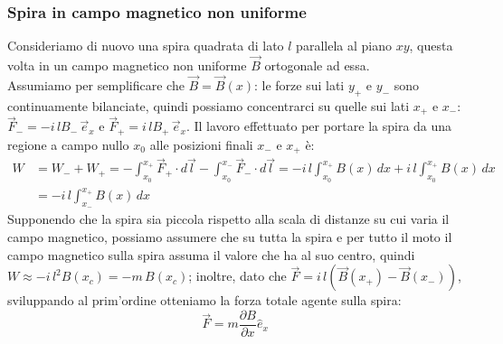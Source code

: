 \subsubsection{Spira in campo magnetico non uniforme}

Consideriamo di nuovo una spira quadrata di lato $ l $ parallela al piano $ xy $, questa volta in un campo magnetico non uniforme $ \vec{B} $ ortogonale ad essa. \\ 
%
Assumiamo per semplificare che $ \vec{B} = \vec{B}(x) $: le forze sui lati $ y_+ $ e $ y_- $ sono continuamente bilanciate, quindi possiamo concentrarci su quelle sui lati $ x_+ $ e $ x_- $: $ \vec{F}_- = -i\,lB_- \,\vec{e}_x $ e $ \vec{F}_+ = i\,lB_+ \,\vec{e}_x $. Il lavoro effettuato per portare la spira da una regione a campo nullo $ x_0 $ alle posizioni finali $ x_- $ e $ x_+ $ è:
\begin{equation}
	\begin{split}
		W &= W_- + W_+ = -\int_{x_0}^{x_+} \vec{F}_+ \cdot d\vec{l} - \int_{x_0}^{x_-} \vec{F}_- \cdot d\vec{l} = -i\,l\int_{x_0}^{x_+} B(x) \,dx + i\,l\int_{x_0}^{x_+} B(x) \,dx \\ 
		  &= -i\,l\int_{x_-}^{x_+} B(x) \,dx
	\end{split}
	\label{eq:}
\end{equation}
Supponendo che la spira sia piccola rispetto alla scala di distanze su cui varia il campo magnetico, possiamo assumere che su tutta la spira e per tutto il moto il campo magnetico sulla spira assuma il valore che ha al suo centro, quindi $ W \approx -i\,l^2 B(x_c) = -m\,B(x_c) $; inoltre, dato che $ \vec{F} = i\,l\left(\vec{B}(x_+) - \vec{B}(x_-)\right) $, sviluppando al prim'ordine otteniamo la forza totale agente sulla spira:
\begin{equation}
	\vec{F} = m \displaystyle\frac{\partial B}{\partial x} \hat{e}_x
	\label{eq:}
\end{equation}

